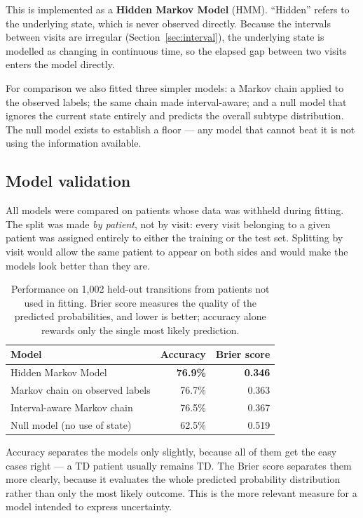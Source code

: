 \documentclass[11pt,a4paper]{article}
\begin{document}
This is implemented as a \textbf{Hidden Markov Model} (HMM). ``Hidden'' refers to
the underlying state, which is never observed directly. Because the intervals
between visits are irregular (Section~\ref{sec:interval}), the underlying state
is modelled as changing in continuous time, so the elapsed gap between two
visits enters the model directly.

For comparison we also fitted three simpler models: a Markov chain applied to
the observed labels; the same chain made interval-aware; and a null model that
ignores the current state entirely and predicts the overall subtype
distribution. The null model exists to establish a floor --- any model that
cannot beat it is not using the information available.

\subsection{Model validation}

All models were compared on patients whose data was withheld during fitting. The
split was made \emph{by patient}, not by visit: every visit belonging to a given
patient was assigned entirely to either the training or the test set. Splitting
by visit would allow the same patient to appear on both sides and would make the
models look better than they are.

\begin{table}[H]
\centering
\begin{tabular}{@{}lrr@{}}
\toprule
\textbf{Model} & \textbf{Accuracy} & \textbf{Brier score} \\
\midrule
Hidden Markov Model                & \textbf{76.9\%} & \textbf{0.346} \\
Markov chain on observed labels    & 76.7\%          & 0.363 \\
Interval-aware Markov chain        & 76.5\%          & 0.367 \\
Null model (no use of state)       & 62.5\%          & 0.519 \\
\bottomrule
\end{tabular}
\caption{Performance on 1{,}002 held-out transitions from patients not used in
fitting. Brier score measures the quality of the predicted probabilities, and
lower is better; accuracy alone rewards only the single most likely prediction.}
\end{table}

\noindent
Accuracy separates the models only slightly, because all of them get the easy
cases right --- a TD patient usually remains TD. The Brier score separates them
more clearly, because it evaluates the whole predicted probability distribution
rather than only the most likely outcome. This is the more relevant measure for
a model intended to express uncertainty.
\end{document}
